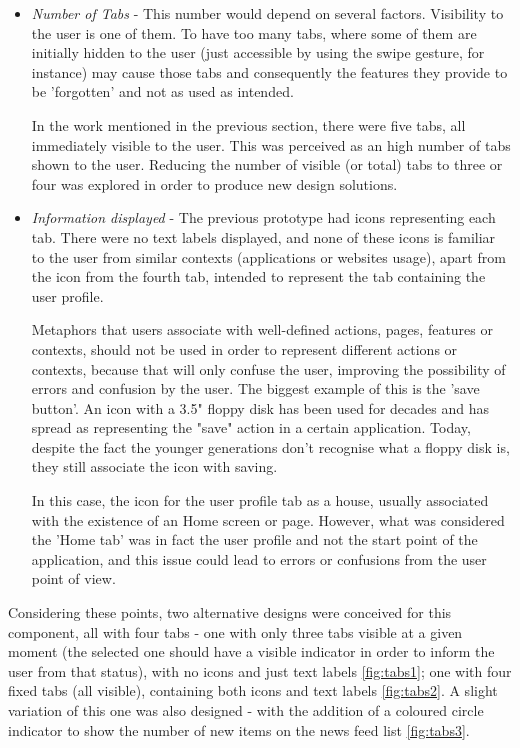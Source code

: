 \begin{itemize}
\item \emph{Number of Tabs} - This number would depend on several factors. Visibility to the user is one of them. To have too many tabs, where some of them are initially hidden to the user (just accessible by using the swipe gesture, for instance) may cause those tabs and consequently the features they provide to be 'forgotten' and not as used as intended. 

In the work mentioned in the previous section, there were five tabs, all immediately visible to the user. This was perceived as an high number of tabs shown to the user. Reducing the number of visible (or total) tabs to three or four was explored in order to produce new design solutions.

\item \emph{Information displayed} - The previous prototype had icons representing each tab. There were no text labels displayed, and none of these icons is familiar to the user from similar contexts (applications or websites usage), apart from the icon from the fourth tab, intended to represent the tab containing the user profile. 

Metaphors that users associate with well-defined actions, pages, features or contexts, should not be used in order to represent different actions or contexts, because that will only confuse the user, improving the possibility of errors and confusion by the user. The biggest example of this is the 'save button'. An icon with a 3.5" floppy disk has been used for decades and has spread as representing the "save" action in a certain application. Today, despite the fact the younger generations don't recognise what a floppy disk is, they still associate the icon with saving.

In this case, the icon for the user profile tab as a house, usually associated with the existence of an Home screen or page. However, what was considered the 'Home tab' was in fact the user profile and not the start point of the application, and this issue could lead to errors or confusions from the user point of view.
\end{itemize}

Considering these points, two alternative designs were conceived for this component, all with four tabs - one with only three tabs visible at a given moment (the selected one should have a visible indicator in order to inform the user from that status), with no icons and just text labels \ref{fig:tabs1}; one with four fixed tabs (all visible), containing both icons and text labels \ref{fig:tabs2}. A slight variation of this one was also designed - with the addition of a coloured circle indicator to show the number of new items on the news feed list \ref{fig:tabs3}.

